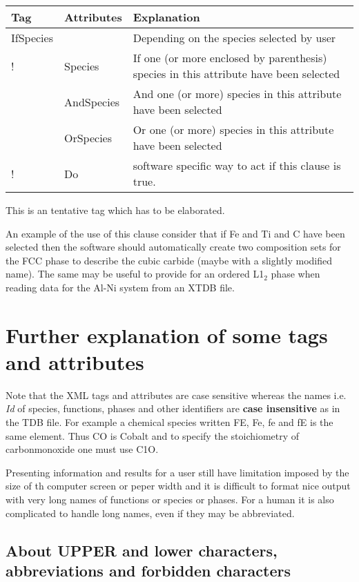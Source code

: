\documentclass{article}
\begin{document}
\bigskip
\begin{tabular}{|p{} p{} p{}|}\hline
  Tag & Attributes &  Explanation\\\hline

  IfSpecies & & Depending on the species selected by user\\
!      & Species & If one (or more enclosed by parenthesis) species
                  in this attribute have been selected\\
      & AndSpecies & And one (or more) species in this attribute have
                     been selected\\
      & OrSpecies & Or one (or more) species in this attribute have
                     been selected\\
!      & Do & software specific way to act if this clause is true.\\\hline
  
\end{tabular}

This is an tentative tag which has to be elaborated.

An example of the use of this clause consider that if Fe and Ti and C
have been selected then the software should automatically create two
composition sets for the FCC phase to describe the cubic carbide
(maybe with a slightly modified name).  The same may be useful to
provide for an ordered L1$_2$ phase when reading data for the Al-Ni
system from an XTDB file.

\section{Further explanation of some tags and attributes}\label{sec:attributes}

Note that the XML tags and attributes are case sensitive whereas the
names i.e. {\em Id} of species, functions, phases and other identifiers
are {\bf case insensitive} as in the TDB file.  For example a chemical
species written FE, Fe, fe and fE is the same element.  Thus CO is
Cobalt and to specify the stoichiometry of carbonmonoxide one must use
C1O.

Presenting information and results for a user still have limitation
imposed by the size of th computer screen or peper width and it is
difficult to format nice output with very long names of functions or
species or phases.  For a human it is also complicated to handle long
names, even if they may be abbreviated.

\subsection{About UPPER and lower characters, abbreviations and forbidden characters}\label{sec:lettercase}
\end{document}

